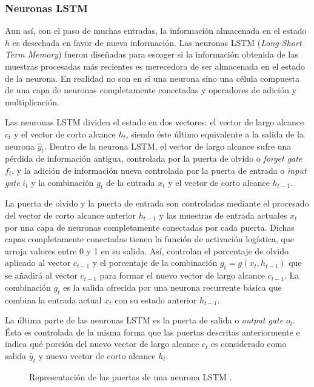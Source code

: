 \subsubsection{Neuronas LSTM}

Aun así, con el paso de muchas entradas, la información almacenada en el estado $h$ es desechada en favor de nueva información. Las neuronas LSTM (\textit{Long-Short Term Memory}) fueron diseñadas para escoger si la información obtenida de las muestras procesadas más recientes es merecedora de ser almacenada en el estado de la neurona. En realidad no son en sí una neurona sino una célula compuesta de una capa de neuronas completamente conectadas y operadores de adición y multiplicación.

Las neuronas LSTM dividen el estado en dos vectores: el vector de largo alcance $c_t$ y el vector de corto alcance $h_t$, siendo éste último equivalente a la salida de la neurona $\hat{y}_t$. Dentro de la neurona LSTM, el vector de largo alcance sufre una pérdida de información antigua, controlada por la puerta de olvido o \textit{forget gate} $f_t$, y la adición de información nueva controlada por la puerta de entrada o \textit{input gate} $i_t$ y la combinación $g_t$ de la entrada $x_t$ y el vector de corto alcance $h_{t-1}$.

La puerta de olvido y la puerta de entrada son controladas mediante el procesado del vector de corto alcance anterior $h_{t-1}$ y las muestras de entrada actuales $x_t$ por una capa de neuronas completamente conectadas por cada puerta. Dichas capas completamente conectadas tienen la función de activación logística, que arroja valores entre 0 y 1 en su salida. Así, controlan el porcentaje de olvido aplicado al vector $c_{t-1}$ y el porcentaje de la combinación $g_t=g(x_t,h_{t-1})$ que se añadirá al vector $c_{t-1}$ para formar el nuevo vector de largo alcance $c_{t-1}$. La combinación $g_t$ es la salida ofrecida por una neurona recurrente básica que combina la entrada actual $x_t$ con su estado anterior $h_{t-1}$.

La última parte de las neuronas LSTM es la puerta de salida o \textit{output gate} $o_t$. Ésta es controlada de la misma forma que las puertas descritas anteriormente e indica qué porción del nuevo vector de largo alcance $c_t$ es considerado como salida $\hat{y}_t$ y nuevo vector de corto alcance $h_t$.

\begin{figure}[h!]
	\centering
	
	\caption{Representación de las puertas de una neurona LSTM \cite{tfgalicia}.}
	\label{fig:lstm_gates}
\end{figure}
\FloatBarrier

